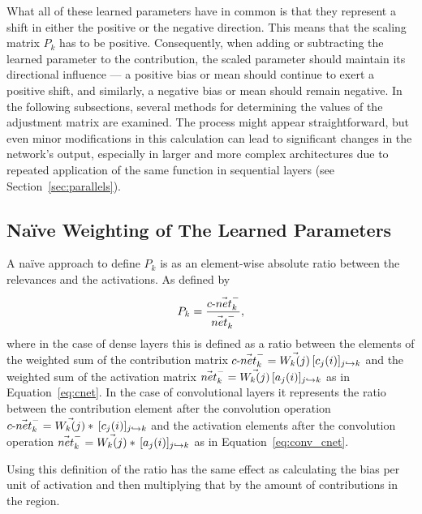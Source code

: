 What all of these learned parameters have in common is that they represent a shift in either the positive or the negative direction. This means that the scaling matrix $P_{k}$ has to be positive. Consequently, when adding or subtracting the learned parameter to the contribution, the scaled parameter should maintain its directional influence --- a positive bias or mean should continue to exert a positive shift, and similarly, a negative bias or mean should remain negative. In the following subsections, several methods for determining the values of the adjustment matrix are examined. The process might appear straightforward, but even minor modifications in this calculation can lead to significant changes in the network's output, especially in larger and more complex architectures due to repeated application of the same function in sequential layers (see Section~\ref{sec:parallels}).

\subsection{Naïve Weighting of The Learned Parameters}
\label{naive}

A naïve approach to define $P_{k}$ is as an element-wise absolute ratio between the relevances and the activations. As defined by
\begin{equation*}
    P_{k} = \dfrac{\text{$c$-}\vec{net}_{k}^-}{\vec{net}_{k}^-} ,
\end{equation*}
where in the case of dense layers this is defined as a ratio between the elements of the weighted sum of the contribution matrix $\text{$c$-}\vec{net}_{k}^- =\vec{W_k(j)}\,[c_j(i)]_{j\hookrightarrow k}$ and the weighted sum of the activation matrix $\vec{net}_{k}^- = \vec{W_k(j)}\,[a_j(i)]_{j\hookrightarrow k}$ as in Equation~\ref{eq:cnet}. In the case of convolutional layers it represents the ratio between the contribution element after the convolution operation $\text{$c$-}\vec{net}_{k}^- =\vec{W_k(j)}\ast\,[c_j(i)]_{j\hookrightarrow k}$
and the activation elements after the convolution operation $\vec{net}_{k}^- = \vec{W_k(j)} \ast \,[a_j(i)]_{j\hookrightarrow k}$ as in Equation~\ref{eq:conv_cnet}. 

Using this definition of the ratio has the same effect as calculating the bias per unit of activation and then multiplying that by the amount of contributions in the region.

